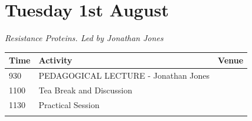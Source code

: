 \documentclass[12pt,]{book}
\theoremstyle{definition}
\theoremstyle{definition}
\theoremstyle{remark}
\begin{document}
\section*{Tuesday 1st August}\label{tuesday-1st-august}

\emph{Resistance Proteins. Led by Jonathan Jones}

\begin{longtable}[]{@{}lll@{}}
\toprule
\begin{minipage}[b]{0.09\columnwidth}\raggedright\strut
Time\strut
\end{minipage} & \begin{minipage}[b]{0.39\columnwidth}\raggedright\strut
Activity\strut
\end{minipage} & \begin{minipage}[b]{0.39\columnwidth}\raggedright\strut
Venue\strut
\end{minipage}\tabularnewline
\midrule
\endhead
\begin{minipage}[t]{0.09\columnwidth}\raggedright\strut
930\strut
\end{minipage} & \begin{minipage}[t]{0.39\columnwidth}\raggedright\strut
PEDAGOGICAL LECTURE - Jonathan Jones\strut
\end{minipage} & \begin{minipage}[t]{0.39\columnwidth}\raggedright\strut
\strut
\end{minipage}\tabularnewline
\begin{minipage}[t]{0.09\columnwidth}\raggedright\strut
1100\strut
\end{minipage} & \begin{minipage}[t]{0.39\columnwidth}\raggedright\strut
Tea Break and Discussion\strut
\end{minipage} & \begin{minipage}[t]{0.39\columnwidth}\raggedright\strut
\strut
\end{minipage}\tabularnewline
\begin{minipage}[t]{0.09\columnwidth}\raggedright\strut
1130\strut
\end{minipage} & \begin{minipage}[t]{0.39\columnwidth}\raggedright\strut
Practical Session\strut
\end{minipage} & \begin{minipage}[t]{0.39\columnwidth}\raggedright\strut
\strut
\end{minipage}\tabularnewline
\begin{minipage}[t]{0.09\columnwidth}\raggedright\strut

\end{minipage}
\end{longtable}
\end{document}
